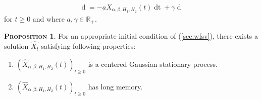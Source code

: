 \documentclass[a4paper, twoside, 11pt]{article}
\theoremstyle{definition}
\newtheorem{proposition}[definition]{\scshape Proposition}
\begin{document}
\begin{eqnarray}
  \mathop{dX_{\alpha,\beta,H_1,H_2}(t)} = -aX_{\alpha,\beta,H_1,H_2}(t)\mathop{dt} + \gamma \mathop{dM_{\alpha,\beta,H_1,H_2}(t)}
  \label{sec:wfsv}
\end{eqnarray}
for $t\ge 0$ and where $a, \gamma \in \mathbb{R}_+$.

\begin{proposition}
  For an appropriate initial condition of (\ref{sec:wfsv}), there exists a solution $\hat{X_t}$ satisfying following properties:
\begin{enumerate}[topsep=0pt, itemsep=-1ex, partopsep=1ex, parsep=1ex, label=(\roman*)]
  \item $(\hat{X}_{\alpha,\beta,H_1,H_2}(t))_{t\ge 0}$ is a centered Gaussian stationary process.
  \item $(\hat{X}_{\alpha,\beta,H_1,H_2}(t))_{t \ge 0}$ has long memory.
  \end{enumerate}
\end{proposition}
\end{document}
